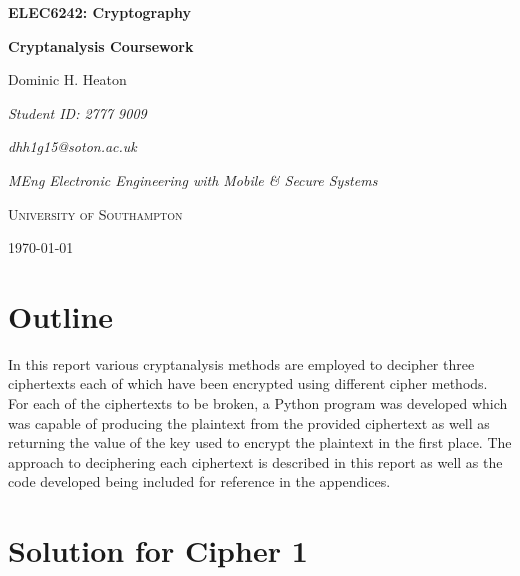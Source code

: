 \documentclass[a4paper,11pt]{article}
\begin{document}

\begin{titlepage}

	\centering
	
	{\LARGE\bfseries ELEC6242: Cryptography \par}
	{\LARGE\bfseries Cryptanalysis Coursework \par}	

	\vspace{7cm}
	{\Large Dominic H. Heaton \par}
	
	\vspace{2cm}
	{\large\itshape Student ID: 2777 9009 \par}
	{\large\itshape dhh1g15@soton.ac.uk \par}
	{\large\itshape MEng Electronic Engineering with Mobile \& Secure Systems \par}
		
	\vfill
	{\scshape\LARGE University of Southampton \par}
	{\large \today \par}
	
\end{titlepage}

\tableofcontents
\pagebreak

\section{Outline} \label{Outline}
In this report various cryptanalysis methods are employed to decipher three ciphertexts each of which have been encrypted using different cipher methods. For each of the ciphertexts to be broken, a Python program was developed which was capable of producing the plaintext from the provided ciphertext as well as returning the value of the key used to encrypt the plaintext in the first place. The approach to deciphering each ciphertext is described in this report as well as the code developed being included for reference in the appendices.

\section{Solution for Cipher 1} \label{Solution for Cipher 1}
\end{document}
